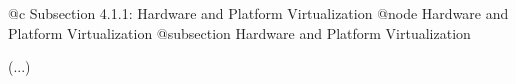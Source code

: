 @c Subsection 4.1.1: Hardware and Platform Virtualization
@node Hardware and Platform Virtualization
@subsection Hardware and Platform Virtualization

(...)

